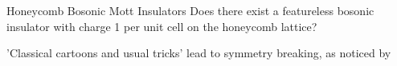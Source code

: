 \begin{frame}{Honeycomb Bosonic Mott Insulators}
\vskip-1.5cm
Does there exist a featureless bosonic insulator with charge 1 per unit cell on the honeycomb lattice?

'Classical cartoons and usual tricks' lead to symmetry breaking, as noticed by \cite{parameswaran2013}

\end{frame}